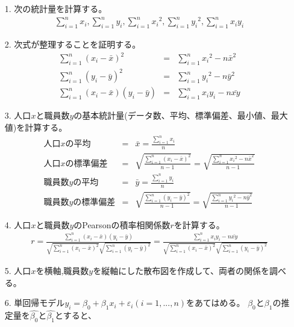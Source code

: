 \documentclass[12pt]{jarticle}
\begin{document}
\begin{itemize}
    \item [1.]次の統計量を計算する。
          \begin{eqnarray}
              \sum_{i=1}^{n} x_i,　\sum_{i=1}^{n} y_i,　\sum_{i=1}^{n} {x_i}^2,　\sum_{i=1}^{n} {y_i}^2,　\sum_{i=1}^{n} x_iy_i \nonumber
          \end{eqnarray}
    \item [2.]次式が整理することを証明する。
          \begin{eqnarray}
              \sum_{i=1}^{n} (x_i-\bar{x})^2&=&\sum_{i=1}^{n} {x_i}^2-n\bar{x}^2 \\
              \sum_{i=1}^{n} (y_i-\bar{y})^2&=&\sum_{i=1}^{n} {y_i}^2-n\bar{y}^2 \\
              \sum_{i=1}^{n} (x_i-\bar{x})(y_i-\bar{y})&=&\sum_{i=1}^{n} {x_iy_i}-n\bar{xy}
          \end{eqnarray}
    \item [3.]人口$x$と職員数$y$の基本統計量(データ数、平均、標準偏差、最小値、最大値)を計算する。
          \begin{eqnarray}
              人口xの平均&=&\bar{x}=\frac{\sum_{i=1}^{n} x_i}{n} \\
              人口xの標準偏差&=&\sqrt{\frac{\sum_{i=1}^{n} (x_i-\bar{x})^2}{n-1}}=\sqrt{\frac{\sum_{i=1}^{n} {x_i}^2-n\bar{x}^2}{n-1}} \\
              職員数yの平均&=&\bar{y}=\frac{\sum_{i=1}^{n} y_i}{n} \\
              職員数yの標準偏差&=&\sqrt{\frac{\sum_{i=1}^{n} (y_i-\bar{y})^2}{n-1}}=\sqrt{\frac{\sum_{i=1}^{n} {y_i}^2-n\bar{y}^2}{n-1}}
          \end{eqnarray}
    \item [4.]人口$x$と職員数$y$のPearsonの積率相関係数$r$を計算する。
          \begin{eqnarray}
              r=\frac{\sum_{i=1}^{n} (x_i-\bar{x})(y_i-\bar{y})}{\sqrt{\sum_{i=1}^{n} (x_i-\bar{x})^2} \sqrt{\sum_{i=1}^{n} (y_i-\bar{y})^2}}=\frac{\sum_{i=1}^{n} {x_iy_i}-n\bar{xy}}{\sqrt{\sum_{i=1}^{n} (x_i-\bar{x})^2} \sqrt{\sum_{i=1}^{n} (y_i-\bar{y})^2}}
          \end{eqnarray}
    \item [5.]人口$x$を横軸,職員数$y$を縦軸にした散布図を作成して、両者の関係を調べる。
    \item [6.]単回帰モデル$y_i=\beta_0+\beta_1 x_i + \varepsilon_i(i=1,...,n)$をあてはめる。
          $\beta_0$と$\beta_1$の推定量を$\hat{\beta_0}$と$\hat{\beta_1}$とすると、

\end{itemize}
\end{document}
